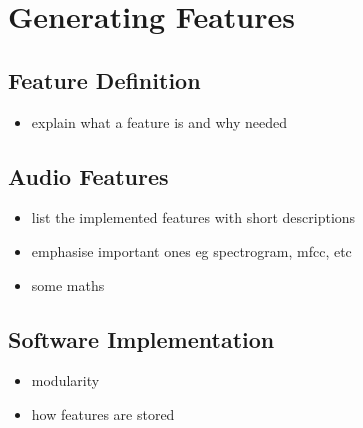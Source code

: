 \section{Generating Features}
\label{sec:pl-feats}
    \subsection{Feature Definition}
    \label{subsec:pl-feats-def}
        \begin{itemize}
            \item{explain what a feature is and why needed}
        \end{itemize}
        
    \subsection{Audio Features}
    \label{subsec:pl-feats-audio}
        \begin{itemize}
            \item{list the implemented features with short descriptions}
            \item{emphasise important ones eg spectrogram, mfcc, etc}
            \item{some maths}
        \end{itemize}
        
    \subsection{Software Implementation}
    \label{subsec:pl-feats-software}
        \begin{itemize}
            \item{modularity}
            \item{how features are stored}
        \end{itemize}
        
  